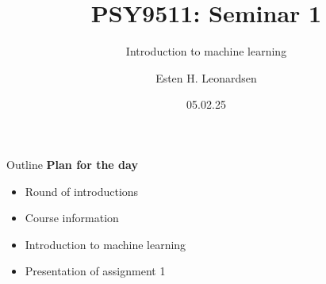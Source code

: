\documentclass[10pt]{beamer}
\title{PSY9511: Seminar 1}
\subtitle{Introduction to machine learning}
\author{Esten H. Leonardsen}
\date{05.02.25}
\begin{document}
	\begin{frame}
	 	\maketitle
	\end{frame}

    \begin{frame}{Outline}
        \textbf{Plan for the day}
        \begin{itemize}
            \item Round of introductions
            \item Course information
            \item Introduction to machine learning
            \item Presentation of assignment 1
        \end{itemize}
    \end{frame}

    
    
\end{document}
